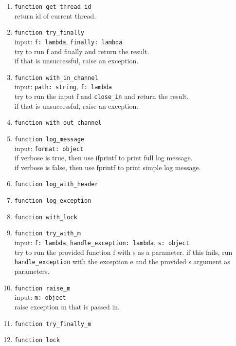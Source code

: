 \begin{enumerate}
    \item \verb|function get_thread_id| \\
    return id of current thread.
    \item \verb|function try_finally| \\
    input: \verb|f: lambda|, \verb|finally: lambda| \\
    try to run f and finally and return the result. \\
    if that is unsuccessful, raise an exception.
    \item \verb|function with_in_channel| \\
    input: \verb|path: string|, \verb|f: lambda| \\
    try to run the input f and \verb|close_in| and return the result. \\
    if that is unsuccessful, raise an exception.
    \item \verb|function with_out_channel| \\
    \item \verb|function log_message| \\
    input: \verb|format: object| \\
    if verbose is true, then use ifprintf to print full log message. \\
    if verbose is false, then use fprintf to print simple log message.
    \item \verb|function log_with_header| \\
    \item \verb|function log_exception| \\
    \item \verb|function with_lock| \\
    \item \verb|function try_with_m| \\
    input: \verb|f: lambda|, \verb|handle_exception: lambda|, \verb|s: object| \\
    try to run the provided function f with s as a parameter.
    if this fails, run \verb|handle_exception| with the exception e and the provided s argument as parameters.
    \item \verb|function raise_m| \\
    input: \verb|m: object| \\
    raise exception m that is passed in.
    \item \verb|function try_finally_m| \\
    \item \verb|function lock| \\

\end{enumerate}

